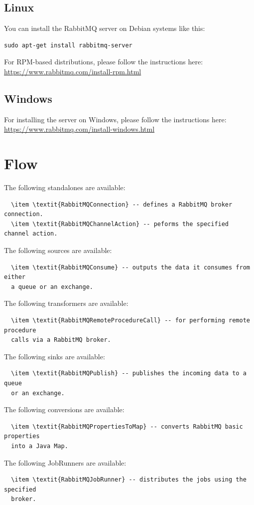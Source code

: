 \documentclass[a4paper]{book}
\begin{document}
\section{Linux}
You can install the RabbitMQ server on Debian systems like this:
\begin{verbatim}
sudo apt-get install rabbitmq-server
\end{verbatim}

\noindent For RPM-based distributions, please follow the instructions here: \\
\url{https://www.rabbitmq.com/install-rpm.html}{}

\section{Windows}
For installing the server on Windows, please follow the instructions here: \\
\url{https://www.rabbitmq.com/install-windows.html}{}

\chapter{Flow}
The following standalones are available:
\begin{verbatim}
  \item \textit{RabbitMQConnection} -- defines a RabbitMQ broker connection.
  \item \textit{RabbitMQChannelAction} -- peforms the specified channel action.
\end{verbatim}

The following sources are available:
\begin{verbatim}
  \item \textit{RabbitMQConsume} -- outputs the data it consumes from either
  a queue or an exchange.
\end{verbatim}

The following transformers are available:
\begin{verbatim}
  \item \textit{RabbitMQRemoteProcedureCall} -- for performing remote procedure
  calls via a RabbitMQ broker.
\end{verbatim}

The following sinks are available:
\begin{verbatim}
  \item \textit{RabbitMQPublish} -- publishes the incoming data to a queue
  or an exchange.
\end{verbatim}

The following conversions are available:
\begin{verbatim}
  \item \textit{RabbitMQPropertiesToMap} -- converts RabbitMQ basic properties
  into a Java Map.
\end{verbatim}

The following JobRunners are available:
\begin{verbatim}
  \item \textit{RabbitMQJobRunner} -- distributes the jobs using the specified
  broker.
\end{verbatim}



\end{document}
